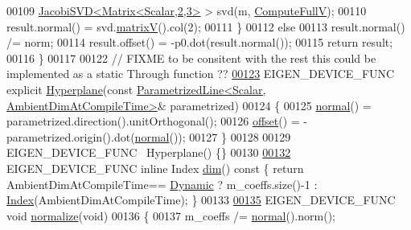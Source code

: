 \begin{DoxyCode}
00109       \hyperlink{group___s_v_d___module_class_eigen_1_1_jacobi_s_v_d}{JacobiSVD<Matrix<Scalar,2,3>} > svd(m, 
      \hyperlink{group__enums_ggae3e239fb70022eb8747994cf5d68b4a9a52c6f7e80bbf9a42297c88f700245b51}{ComputeFullV});
00110       result.normal() = svd.\hyperlink{group___s_v_d___module_a245a453b5e7347f737295c23133238c4}{matrixV}().col(2);
00111     \}
00112     \textcolor{keywordflow}{else}
00113       result.normal() /= norm;
00114     result.offset() = -p0.dot(result.normal());
00115     \textcolor{keywordflow}{return} result;
00116   \}
00117 
00122   \textcolor{comment}{// FIXME to be consitent with the rest this could be implemented as a static Through function ??}
\hyperlink{group___geometry___module_ab0096b58dd2a7d4e5c5d66e824c3b657}{00123}   EIGEN\_DEVICE\_FUNC \textcolor{keyword}{explicit} \hyperlink{group___geometry___module_ab0096b58dd2a7d4e5c5d66e824c3b657}{Hyperplane}(\textcolor{keyword}{const} 
      \hyperlink{group___geometry___module_class_eigen_1_1_parametrized_line}{ParametrizedLine<Scalar, AmbientDimAtCompileTime>}& 
      parametrized)
00124   \{
00125     \hyperlink{group___geometry___module_ad3da930fc7025604f2f174651089b2a8}{normal}() = parametrized.direction().unitOrthogonal();
00126     \hyperlink{group___geometry___module_afe2eadf3679e4a802c0e02c15049aed9}{offset}() = -parametrized.origin().dot(\hyperlink{group___geometry___module_ad3da930fc7025604f2f174651089b2a8}{normal}());
00127   \}
00128 
00129   EIGEN\_DEVICE\_FUNC ~Hyperplane() \{\}
00130 
\hyperlink{group___geometry___module_a44f0dab75a838cdadf1df9150648b8ed}{00132}   EIGEN\_DEVICE\_FUNC \textcolor{keyword}{inline} Index \hyperlink{group___geometry___module_a44f0dab75a838cdadf1df9150648b8ed}{dim}()\textcolor{keyword}{ const }\{ \textcolor{keywordflow}{return} AmbientDimAtCompileTime==
      \hyperlink{namespace_eigen_ad81fa7195215a0ce30017dfac309f0b2}{Dynamic} ? m\_coeffs.size()-1 : \hyperlink{group___geometry___module_a58d2307d16128a0026021374e9e10465}{Index}(AmbientDimAtCompileTime); \}
00133 
\hyperlink{group___geometry___module_ac12d2a82db8f058f01b2de92d55a65e6}{00135}   EIGEN\_DEVICE\_FUNC \textcolor{keywordtype}{void} \hyperlink{group___geometry___module_ac12d2a82db8f058f01b2de92d55a65e6}{normalize}(\textcolor{keywordtype}{void})
00136   \{
00137     m\_coeffs /= \hyperlink{group___geometry___module_ad3da930fc7025604f2f174651089b2a8}{normal}().norm();

\end{DoxyCode}
